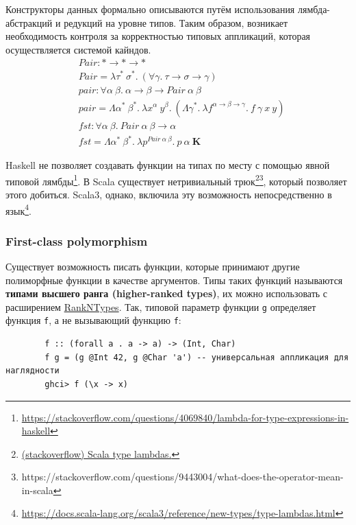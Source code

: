 \documentclass[12pt]{article}
\newcommand{\vocab}[1]{\textbf{#1}} %
\begin{document}
    Конструкторы данных формально описываются путём использования лямбда-абстракций и редукций на уровне типов.
    Таким образом, возникает необходимость контроля за корректностью типовых аппликаций, которая осуществляется системой кайндов.
    \begin{align*}
        &Pair : * \rightarrow * \rightarrow * \\
        &Pair = \lambda \tau^*~\sigma^*.~(\forall \gamma.~\tau\rightarrow\sigma\rightarrow\gamma) \\
        &pair : \forall \alpha~\beta.~\alpha \rightarrow \beta \rightarrow Pair~\alpha~\beta \\
        &pair = \Lambda \alpha^*~\beta^*.~\lambda x^\alpha~y^\beta.~(\Lambda \gamma^*.~\lambda f^{\alpha\rightarrow\beta\rightarrow\gamma}.~f~\gamma~x~y) \\
        &fst : \forall \alpha~\beta.~Pair~\alpha~\beta\rightarrow \alpha \\
        &fst = \Lambda \alpha^*~\beta^*.~\lambda p^{Pair~\alpha~\beta}.~p~\alpha~\mathbf{K}
    \end{align*}

    Haskell не позволяет создавать функции на типах по месту с помощью явной типовой лямбды\footnote{\url{https://stackoverflow.com/questions/4069840/lambda-for-type-expressions-in-haskell}}.
    В Scala существует нетривиальный трюк\footnote{\href{https://stackoverflow.com/questions/8736164/what-are-type-lambdas-in-scala-and-what-are-their-benefits}{(stackoverflow) Scala type lambdas.}}\footnote{https://stackoverflow.com/questions/9443004/what-does-the-operator-mean-in-scala}, который позволяет этого добиться.
    Scala3, однако, включила эту возможность непосредственно в язык\footnote{\url{https://docs.scala-lang.org/scala3/reference/new-types/type-lambdas.html}}.

    \subsubsection{First-class polymorphism}

    Существует возможность писать функции, которые принимают другие полиморфные функции в качестве аргументов.
    Типы таких функций называются \vocab{типами высшего ранга (higher-ranked types)}, их можно использовать с расширением \href{https://downloads.haskell.org/ghc/latest/docs/users_guide/exts/rank_polymorphism.html}{RankNTypes}.
    Так, типовой параметр функции \texttt{g} определяет функция \texttt{f}, а не вызывающий функцию \texttt{f}:
    \begin{verbatim}
        f :: (forall a . a -> a) -> (Int, Char)
        f g = (g @Int 42, g @Char 'a') -- универсальная аппликация для наглядности
        ghci> f (\x -> x)
    \end{verbatim}
\end{document}
